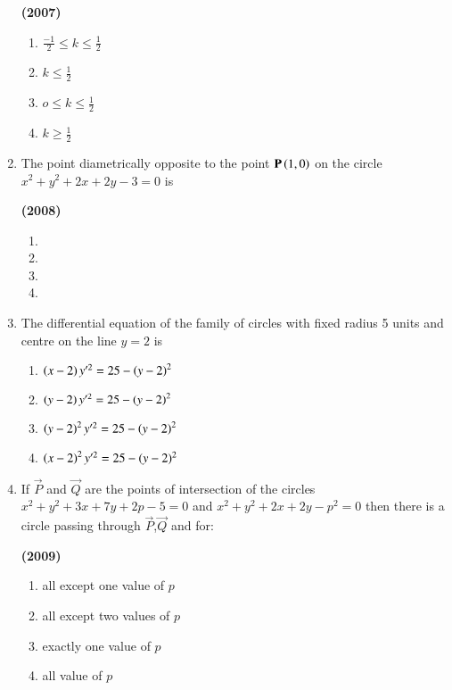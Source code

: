 \documentclass[journal,12pt,twocolumn]{IEEEtran}
\theoremstyle{remark}
\begin{document}
\begin{enumerate}[start=6]
\hfill{\textbf{(2007)}}

\begin{multicols}{2}
\begin{enumerate}[label=(\alph*)]
\item $\frac{-1}{2} \le k \le \frac{1}{2}$
\item $k \le \frac{1}{2}$
\item $o \le k \le \frac{1}{2}$
\item $k \ge \frac{1}{2}$
\end{enumerate}
\end{multicols}
\item The point diametrically opposite to the point $\mathbf{P}\left(1,0\right)$ on the circle $x^2+y^2+2x+2y-3=0$ is 

\hfill{\textbf{(2008)}}

\begin{multicols}{2}
\begin{enumerate}[label=(\alph*)]
\item {}
\item {}
\item {}
\item {}
\end{enumerate}
\end{multicols}
\item The differential equation of the family of circles with fixed radius 5 units and centre on the line $y=2$ is


\begin{enumerate}[label=(\alph*)]
\item $\left(x-2\right)y'^2=25-\left(y-2\right)^2$
\item $\left(y-2\right)y'^2=25-\left(y-2\right)^2$
\item $\left(y-2\right)^2y'^2=25-\left(y-2\right)^2$
\item $\left(x-2\right)^2y'^2=25-(y-2)^2$
\end{enumerate}
\item If $\vec{P}$ and $\vec{Q}$ are the points of intersection of the circles $x^2+y^2+3x+7y+2p-5=0$ and $x^2+y^2+2x+2y-p^2=0$ then there is a circle passing through $\vec{P}$,$\vec{Q}$ and  for:

\hfill{\textbf{(2009)}}

\begin{enumerate}[label=(\alph*)]
\item all except one value of $p$
\item all except two values of $p$
\item exactly one value of $p$
\item all value of $p$
\end{enumerate}
\end{enumerate}
\end{document}
